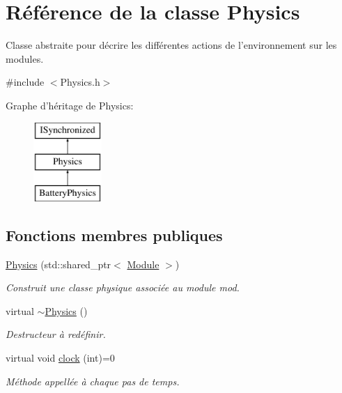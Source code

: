 \hypertarget{classPhysics}{\section{Référence de la classe Physics}
\label{classPhysics}
}


Classe abstraite pour décrire les différentes actions de l'environnement sur les modules.  




{\ttfamily \#include $<$Physics.\-h$>$}

Graphe d'héritage de Physics\-:\begin{figure}[H]
\begin{center}
\leavevmode
\includegraphics[height=3.000000cm]{classPhysics}
\end{center}
\end{figure}
\subsection*{Fonctions membres publiques}
\begin{DoxyCompactItemize}
\item 
\hypertarget{classPhysics_a6007da7545dc8ba917cd3b97439d4548}{\hyperlink{classPhysics_a6007da7545dc8ba917cd3b97439d4548}{Physics} (std\-::shared\-\_\-ptr$<$ \hyperlink{classModule}{Module} $>$)}\label{classPhysics_a6007da7545dc8ba917cd3b97439d4548}

\begin{DoxyCompactList}\small\item\em Construit une classe physique associée au module mod. \end{DoxyCompactList}\item 
\hypertarget{classPhysics_a045c3788e28059d3920136499942490f}{virtual \hyperlink{classPhysics_a045c3788e28059d3920136499942490f}{$\sim$\-Physics} ()}\label{classPhysics_a045c3788e28059d3920136499942490f}

\begin{DoxyCompactList}\small\item\em Destructeur à redéfinir. \end{DoxyCompactList}\item 
\hypertarget{classPhysics_a041a4739fb28602797808c646c8018fa}{virtual void \hyperlink{classPhysics_a041a4739fb28602797808c646c8018fa}{clock} (int)=0}\label{classPhysics_a041a4739fb28602797808c646c8018fa}

\begin{DoxyCompactList}\small\item\em Méthode appellée à chaque pas de temps. \end{DoxyCompactList}\end{DoxyCompactItemize}
